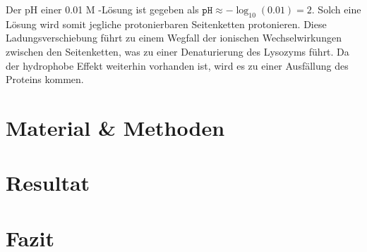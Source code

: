 \documentclass[a4paper]{scrreprt}
\begin{document}
Der pH einer 0.01 M -Lösung ist gegeben als $\texttt{pH} \approx
-\log_{10}(0.01) = 2$. Solch eine Lösung wird somit jegliche protonierbaren
Seitenketten protonieren. Diese Ladungsverschiebung führt zu einem Wegfall der
ionischen Wechselwirkungen zwischen den Seitenketten, was zu einer
Denaturierung des Lysozyms führt. Da der hydrophobe Effekt weiterhin vorhanden
ist, wird es zu einer Ausfällung des Proteins kommen.

\chapter{Material \& Methoden}

\chapter{Resultat}

\chapter{Fazit}
\end{document}
